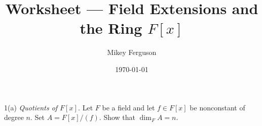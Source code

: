 \documentclass[11pt]{article}
\title{Worksheet --- Field Extensions and the Ring $F[x]$}
\author{Mikey Ferguson}
\date{\today}
\begin{document}
\maketitle


\begin{problem}{1(a)}
  \emph{Quotients of $F[x]$.} Let $F$ be a field and let $f \in F[x]$ be
  nonconstant of degree $n$. Set $A = F[x]/(f)$. Show that
  $\dim_F A = n$.
\end{problem}

\end{document}
